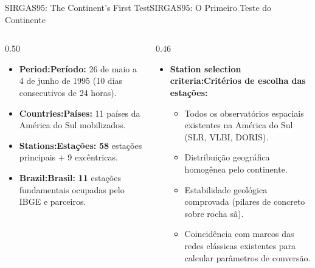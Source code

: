 \documentclass[aspectratio=169,11pt]{beamer}
\newcommand{\tr}[2]{\ifEN#2\else#1\fi}
\newcommand{\bnum}[1]{\ifmmode\textcolor{mTeal}{\mathbf{#1}}\else\textbf{\textcolor{mTeal}{#1}}\fi}
\begin{document}
\begin{frame}{\tr{SIRGAS95: O Primeiro Teste do Continente}{SIRGAS95: The Continent's First Test}}
  \begin{columns}[onlytextwidth]
    \begin{column}{0.50\textwidth}
      \begin{tcolorbox}[colback=mTeal!8, colframe=mTeal, title={\tr{A campanha de maio/junho de 1995}{The May/June 1995 Campaign}}]
        \scriptsize
        \begin{itemize}
          \setlength{\itemsep}{3pt}
          \item \textbf{\tr{Período:}{Period:}} 26 de maio a 4 de junho de 1995 (10 dias consecutivos de 24 horas).
          \item \textbf{\tr{Países:}{Countries:}} 11 países da América do Sul mobilizados.
          \item \textbf{\tr{Estações:}{Stations:}} \bnum{\num{58}} estações principais + \num{9} excêntricas.
          \item \textbf{\tr{Brasil:}{Brazil:}} \bnum{\num{11}} estações fundamentais ocupadas pelo IBGE e parceiros.
        \end{itemize}
      \end{tcolorbox}
    \end{column}
    \begin{column}{0.46\textwidth}
      \begin{itemize}
        \setlength{\itemsep}{4pt}
        \scriptsize
        \item \tr{\textbf{Critérios de escolha das estações:}}{\textbf{Station selection criteria:}}
              \begin{itemize}
                \tiny
                \item Todos os observatórios espaciais existentes na América do Sul (SLR, VLBI, DORIS).
                \item Distribuição geográfica homogênea pelo continente.
                \item Estabilidade geológica comprovada (pilares de concreto sobre rocha sã).
                \item Coincidência com marcos das redes clássicas existentes para calcular parâmetros de conversão.
              \end{itemize}
      \end{itemize}
    \end{column}
  \end{columns}
\end{frame}
\end{document}
